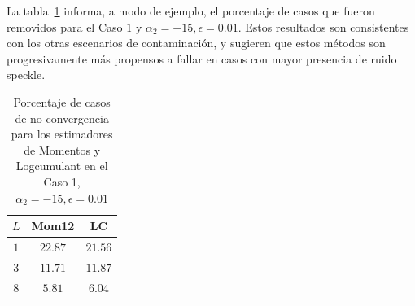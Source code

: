 La tabla~\ref{tabla_removidos} informa, a modo de ejemplo, el porcentaje de casos que fueron removidos para el Caso $1$ y $\alpha_2 = -15, \epsilon = 0.01$. Estos resultados son consistentes con los otras escenarios de contaminación, y sugieren que estos métodos son progresivamente más propensos a fallar en casos con mayor presencia de ruido speckle.

\begin{table}[hbt]
	\centering
	\begin{tabular}{ccc}
		\toprule
		$L$ & Mom12  & LC \\
		\midrule
		$1$ & $22.87$  & $21.56$ \\
		$3$ & $11.71$  &  $11.87$ \\
		$8$ & $5.81$ & $6.04$  \\
		\bottomrule
	\end{tabular}
\caption{\label{tabla_removidos}Porcentaje de casos de no convergencia para los estimadores de Momentos y  Logcumulant en el Caso 1, $\alpha_2 = -15, \epsilon = 0.01$}
\end{table}


